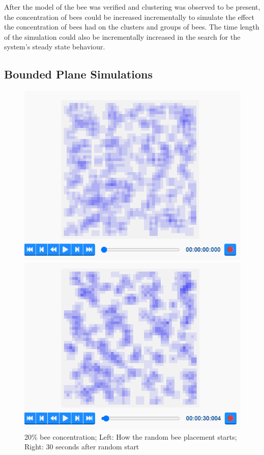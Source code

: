 \documentclass[conference,compsoc,onecolumn]{IEEEtran}
\begin{document}
After the model of the bee was verified and clustering was observed to be present, the concentration of bees could be increased incrementally to simulate the effect the concentration of bees had on the clusters and groups of bees. The time length of the simulation could also be incrementally increased in the search for the system's steady state behaviour. 

\subsection{Bounded Plane Simulations}

\begin{figure}[!tbp]
	\centering
	\begin{minipage}[b]{0.4\textwidth}
		\includegraphics[width=\textwidth]{../images/hive-20per-00-00-00.PNG}
	\end{minipage}
	\hfill
	\begin{minipage}[b]{0.4\textwidth}
		\includegraphics[width=\textwidth]{../images/hive-20per-00-30-00.PNG}
	\end{minipage}
	\caption{20\% bee concentration; Left: How the random bee placement starts; Right: 30 seconds after random start}
	\label{steady}
\end{figure}
\end{document}
